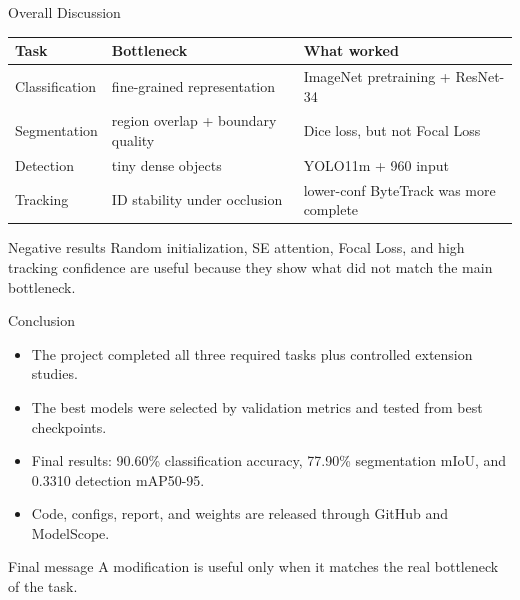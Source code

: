 \documentclass[aspectratio=169,9pt]{beamer}
\begin{document}
\begin{frame}{Overall Discussion}
  \begin{table}
    \centering
    \small
    \begin{tabular}{lll}
      \toprule
      Task & Bottleneck & What worked\\
      \midrule
      Classification & fine-grained representation & ImageNet pretraining + ResNet-34\\
      Segmentation & region overlap + boundary quality & Dice loss, but not Focal Loss\\
      Detection & tiny dense objects & YOLO11m + 960 input\\
      Tracking & ID stability under occlusion & lower-conf ByteTrack was more complete\\
      \bottomrule
    \end{tabular}
  \end{table}
  \begin{block}{Negative results}
    Random initialization, SE attention, Focal Loss, and high tracking confidence are useful because they show what did not match the main bottleneck.
  \end{block}
\end{frame}

\begin{frame}{Conclusion}
  \begin{itemize}
    \item The project completed all three required tasks plus controlled extension studies.
    \item The best models were selected by validation metrics and tested from best checkpoints.
    \item Final results: 90.60\% classification accuracy, 77.90\% segmentation mIoU, and 0.3310 detection mAP50-95.
    \item Code, configs, report, and weights are released through GitHub and ModelScope.
  \end{itemize}
  \vspace{0.6em}
  \begin{block}{Final message}
    A modification is useful only when it matches the real bottleneck of the task.
  \end{block}
\end{frame}
\end{document}
